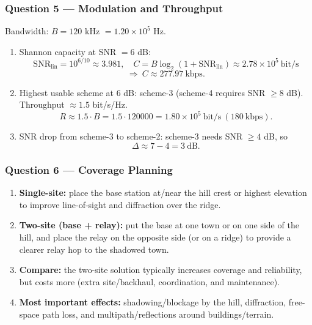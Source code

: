 \documentclass[11pt,a4paper]{article}
\begin{document}
\subsubsection*{Question 5 --- Modulation and Throughput}
Bandwidth: $B=120$ kHz $=1.20\times 10^5$ Hz.

\begin{enumerate}[label=\alph*.]
    \item Shannon capacity at SNR $=6$ dB:
    \[
    \mathrm{SNR}_{\text{lin}}=10^{6/10}\approx 3.981,\quad
    C=B\log_2(1+\mathrm{SNR}_{\text{lin}})\approx 2.78\times 10^5\ \text{bit/s}
    \]
    \[
    \Rightarrow\ C\approx 277.97\ \text{kbps}.
    \]
    \item Highest usable scheme at $6$ dB: scheme-3 (scheme-4 requires SNR $\ge 8$ dB). Throughput $\approx 1.5$ bit/s/Hz.
    \[
    R\approx 1.5\cdot B=1.5\cdot 120000=1.80\times 10^5\ \text{bit/s}\ (180\ \text{kbps}).
    \]
    \item SNR drop from scheme-3 to scheme-2: scheme-3 needs SNR $\ge 4$ dB, so
    \[
    \Delta \approx 7-4=3\ \text{dB}.
    \]
\end{enumerate}

\subsubsection*{Question 6 --- Coverage Planning}
\begin{enumerate}[label=\alph*.]
    \item \textbf{Single-site:} place the base station at/near the hill crest or highest elevation to improve line-of-sight and diffraction over the ridge.
    \item \textbf{Two-site (base + relay):} put the base at one town or on one side of the hill, and place the relay on the opposite side (or on a ridge) to provide a clearer relay hop to the shadowed town.
    \item \textbf{Compare:} the two-site solution typically increases coverage and reliability, but costs more (extra site/backhaul, coordination, and maintenance).
    \item \textbf{Most important effects:} shadowing/blockage by the hill, diffraction, free-space path loss, and multipath/reflections around buildings/terrain.
\end{enumerate}
\end{document}
